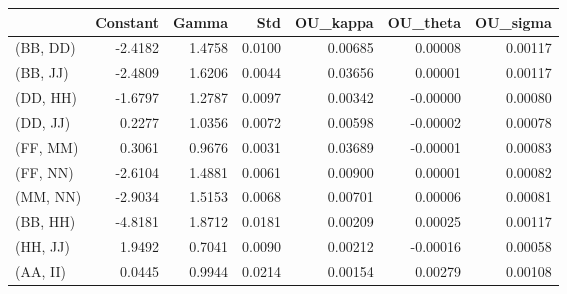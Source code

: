\begin{tabular}{lrrrrrr}
\toprule
{} &  Constant &   Gamma &     Std &  OU\_kappa &  OU\_theta &  OU\_sigma \\
\midrule
(BB, DD) &   -2.4182 &  1.4758 &  0.0100 &   0.00685 &   0.00008 &   0.00117 \\
(BB, JJ) &   -2.4809 &  1.6206 &  0.0044 &   0.03656 &   0.00001 &   0.00117 \\
(DD, HH) &   -1.6797 &  1.2787 &  0.0097 &   0.00342 &  -0.00000 &   0.00080 \\
(DD, JJ) &    0.2277 &  1.0356 &  0.0072 &   0.00598 &  -0.00002 &   0.00078 \\
(FF, MM) &    0.3061 &  0.9676 &  0.0031 &   0.03689 &  -0.00001 &   0.00083 \\
(FF, NN) &   -2.6104 &  1.4881 &  0.0061 &   0.00900 &   0.00001 &   0.00082 \\
(MM, NN) &   -2.9034 &  1.5153 &  0.0068 &   0.00701 &   0.00006 &   0.00081 \\
(BB, HH) &   -4.8181 &  1.8712 &  0.0181 &   0.00209 &   0.00025 &   0.00117 \\
(HH, JJ) &    1.9492 &  0.7041 &  0.0090 &   0.00212 &  -0.00016 &   0.00058 \\
(AA, II) &    0.0445 &  0.9944 &  0.0214 &   0.00154 &   0.00279 &   0.00108 \\
\bottomrule
\end{tabular}
